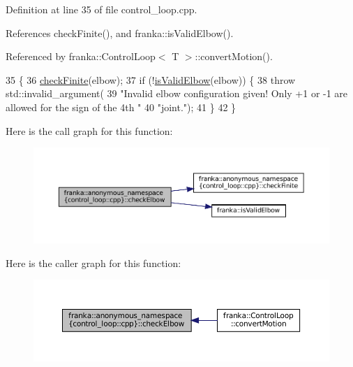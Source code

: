 Definition at line 35 of file control\+\_\+loop.\+cpp.



References check\+Finite(), and franka\+::is\+Valid\+Elbow().



Referenced by franka\+::\+Control\+Loop$<$ T $>$\+::convert\+Motion().


\begin{DoxyCode}
35                                                          \{
36   \hyperlink{namespacefranka_1_1anonymous__namespace_02control__loop_8cpp_03_af284e9c97573a00e6fc31f0c716d6add}{checkFinite}(elbow);
37   \textcolor{keywordflow}{if} (!\hyperlink{namespacefranka_a4eda3eda0514fabf6d630a6d8c0373a0}{isValidElbow}(elbow)) \{
38     \textcolor{keywordflow}{throw} std::invalid\_argument(
39         \textcolor{stringliteral}{"Invalid elbow configuration given! Only +1 or -1 are allowed for the sign of the 4th "}
40         \textcolor{stringliteral}{"joint."});
41   \}
42 \}
\end{DoxyCode}
Here is the call graph for this function\+:
\nopagebreak
\begin{figure}[H]
\begin{center}
\leavevmode
\includegraphics[width=350pt]{namespacefranka_1_1anonymous__namespace_02control__loop_8cpp_03_a36007bd7eb2c55ea2c41d6bdad9c5abc_cgraph}
\end{center}
\end{figure}
Here is the caller graph for this function\+:
\nopagebreak
\begin{figure}[H]
\begin{center}
\leavevmode
\includegraphics[width=350pt]{namespacefranka_1_1anonymous__namespace_02control__loop_8cpp_03_a36007bd7eb2c55ea2c41d6bdad9c5abc_icgraph}
\end{center}
\end{figure}
\mbox{\label{namespacefranka_1_1anonymous__namespace_02control__loop_8cpp_03_af284e9c97573a00e6fc31f0c716d6add}} 
